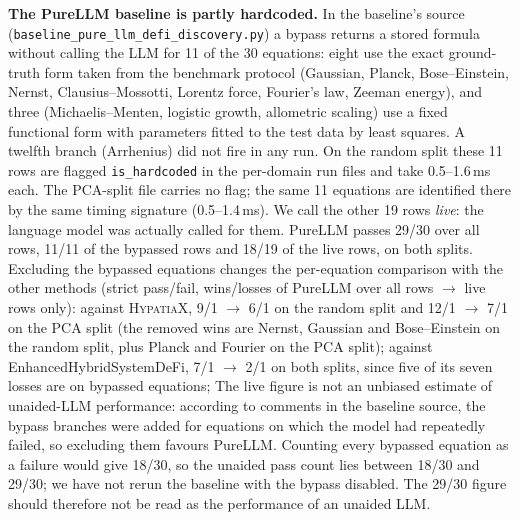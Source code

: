 \documentclass[twoside,11pt]{article}
\begin{document}
\textbf{The PureLLM baseline is partly hardcoded.} In the baseline's source
(\texttt{baseline\_pure\_llm\_defi\_discovery.py}) a bypass returns a stored formula without calling the LLM
for 11 of the 30 equations: eight use the exact ground-truth form taken from the benchmark protocol
(Gaussian, Planck, Bose--Einstein, Nernst, Clausius--Mossotti, Lorentz force, Fourier's law, Zeeman energy), and three
(Michaelis--Menten, logistic growth, allometric scaling) use a fixed functional form with parameters fitted to the
test data by least squares. A twelfth branch (Arrhenius) did not fire in any run. On the random split these 11 rows
are flagged \texttt{is\_hardcoded} in the per-domain run files and take 0.5--1.6\,ms each. The PCA-split file carries
no flag; the same 11 equations are identified there by the same timing signature (0.5--1.4\,ms). We call the other
19 rows \emph{live}: the language model was actually called for them. PureLLM passes 29/30 over all rows, 11/11 of the
bypassed rows and 18/19 of the live rows, on both splits. Excluding the bypassed equations changes the per-equation
comparison with the other methods (strict pass/fail, wins/losses of PureLLM over all rows $\rightarrow$ live rows only):
against \textsc{HypatiaX}, 9/1 $\rightarrow$ 6/1 on the random split and 12/1 $\rightarrow$ 7/1 on the PCA split (the removed
wins are Nernst, Gaussian and Bose--Einstein on the random split, plus Planck and Fourier on the PCA split); against
EnhancedHybridSystemDeFi, 7/1 $\rightarrow$ 2/1 on both splits, since five of its seven losses are on bypassed equations;
The live figure is not an
unbiased estimate of unaided-LLM performance: according to comments in the baseline source, the bypass branches were
added for equations on which the model had repeatedly failed, so excluding them favours PureLLM. Counting every bypassed
equation as a failure would give 18/30, so the unaided pass count lies between 18/30 and 29/30; we have not rerun the
baseline with the bypass disabled. The 29/30 figure should therefore not be read as the performance of an unaided LLM.
\end{document}
